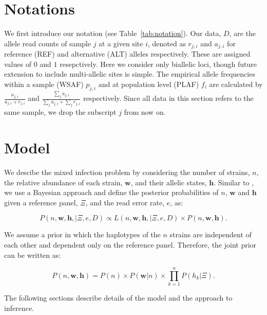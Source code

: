 \documentclass{nature}
\begin{document}



\newpage

\section*{Notations}

We first introduce our notation (see Table~\ref{tab:notation}). Our data, $D$, are the allele read counts of sample $j$ at a given site $i$, denoted as $r_{j,i}$ and $a_{j,i}$ for reference (REF) and alternative (ALT) alleles respectively.  These are assigned values of $0$ and $1$ resepctively. Here we consider only biallelic loci, though future extension to include multi-allelic sites is simple.  The empirical allele frequencies within a sample (WSAF) $p_{j,i}$ and at population level (PLAF) $f_i$ are calculated by $ \frac{a_{j,i}}{a_{j,i} + r_{j,i}}$ and $ \frac{\sum_j a_{j,i}}{\sum_j a_{j,i} + \sum_j r_{j,i}}$ respectively. Since all data in this section refers to the same sample, we drop the subscript $j$ from now on.


\section*{Model}

We descibe the mixed infection problem by considering the number of strains, $n$, the relative abundance of each strain, $\mathbf{w}$, and their allelic states, $\mathbf{h}$. Similar to \cite{Jack2016}, we use a Bayesian approach and define the posterior probabilities of $n$, $\mathbf{w}$ and $\mathbf{h}$ given a reference panel, $\Xi$, and the read error rate, $e$, as:

\begin{equation}
P(n, \mathbf{w}, \mathbf{h}, | \Xi, e, D) \propto L(n, \mathbf{w}, \mathbf{h}, | \Xi, e, D) \times P(n, \mathbf{w}, \mathbf{h}). \label{eqn:post}
\end{equation}

\noindent We assume a prior in which the haplotypes of the $n$ strains are independent of each other and dependent only on the reference panel.  Therefore, the joint prior can be written as:

\begin{equation}
P(n, \mathbf{w}, \mathbf{h}) = P(n) \times P(\mathbf{w} | n) \times \prod_{k=1}^{n} P(h_k | \Xi).
\end{equation}

\noindent The following sections describe details of the model and the approach to inference.
\end{document}
